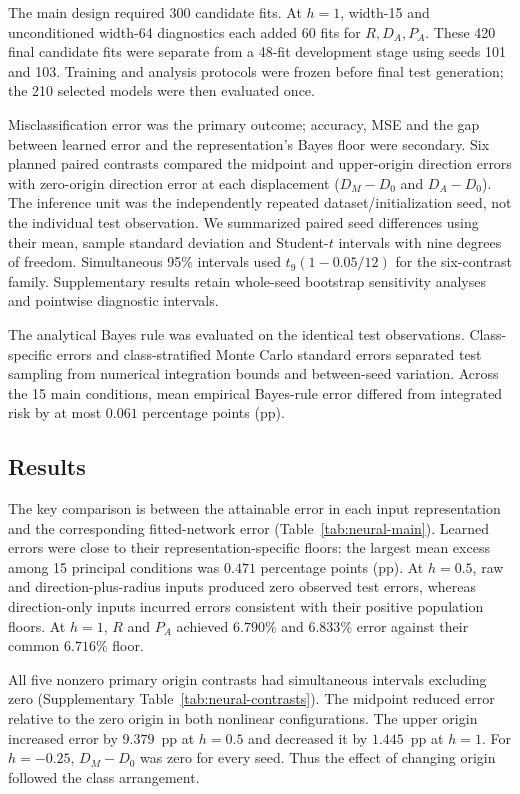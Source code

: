 {The main design required 300 candidate fits. At $h=1$, width-15 and unconditioned width-64 diagnostics each added 60 fits for $R,D_A,P_A$. These 420 final candidate fits were separate from a 48-fit development stage using seeds 101 and 103. Training and analysis protocols were frozen before final test generation; the 210 selected models were then evaluated once. 

Misclassification error was the primary outcome; accuracy, MSE and the gap between learned error and the representation's Bayes floor were secondary. Six planned paired contrasts compared the midpoint and upper-origin direction errors with zero-origin direction error at each displacement ($D_M-D_0$ and $D_A-D_0$). The inference unit was the independently repeated dataset/initialization seed, not the individual test observation. We summarized paired seed differences using their mean, sample standard deviation and Student-$t$ intervals with nine degrees of freedom. Simultaneous 95\% intervals used $t_9(1-0.05/12)$ for the six-contrast family. Supplementary results retain whole-seed bootstrap sensitivity analyses and pointwise diagnostic intervals.

The analytical Bayes rule was evaluated on the identical test observations. Class-specific errors and class-stratified Monte Carlo standard errors separated test sampling from numerical integration bounds and between-seed variation. Across the 15 main conditions, mean empirical Bayes-rule error differed from integrated risk by at most $0.061$ percentage points (pp).

\subsection{Results}
The key comparison is between the attainable error in each input representation and the corresponding fitted-network error (Table~\ref{tab:neural-main}). Learned errors were close to their representation-specific floors: the largest mean excess among 15 principal conditions was $0.471$ percentage points (pp). At $h=0.5$, raw and direction-plus-radius inputs produced zero observed test errors, whereas direction-only inputs incurred errors consistent with their positive population floors. At $h=1$, $R$ and $P_A$ achieved $6.790\%$ and $6.833\%$ error against their common $6.716\%$ floor.

All five nonzero primary origin contrasts had simultaneous intervals excluding zero (Supplementary Table~\ref{tab:neural-contrasts}). The midpoint reduced error relative to the zero origin in both nonlinear configurations. The upper origin increased error by $9.379$~pp at $h=0.5$ and decreased it by $1.445$~pp at $h=1$. For $h=-0.25$, $D_M-D_0$ was zero for every seed. Thus the effect of changing origin followed the class arrangement.

}
